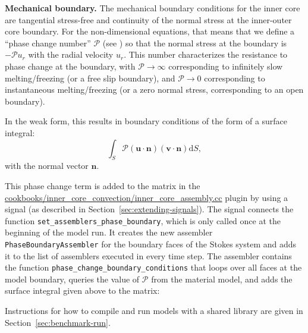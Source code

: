 \documentclass{article}
\begin{document}
\vspace{0.3cm}
\textbf{Mechanical boundary.}
The mechanical boundary conditions for the inner core are
tangential stress-free and continuity of the normal stress at the
inner-outer core boundary. For the non-dimensional equations, that
means that we define a ``phase change number'' $\mathcal{P}$ (see \cite{Deguen2013}) so that the
normal stress at the boundary is $-\mathcal{P} u_r$ with the radial velocity
$u_r$. This number characterizes the resistance to phase change at
the boundary, with $\mathcal{P}\rightarrow\infty$ corresponding to infinitely slow
melting/freezing (or a free slip boundary), and $\mathcal{P}\rightarrow0$ corresponding to
instantaneous melting/freezing (or a zero normal stress, corresponding to an open boundary).

In the weak form, this results in boundary conditions of the form
of a surface integral:
\begin{equation*}
\int_S \mathcal{P} (\mathbf u \cdot \mathbf n) (\mathbf v \cdot \mathbf n) \text{d}S,
\end{equation*}
with the normal vector $\mathbf n$.

This phase change term is added to the matrix in the
\url{cookbooks/inner_core_convection/inner_core_assembly.cc} plugin by using a signal
(as described in Section~\ref{sec:extending-signals}). The signal
connects the function \verb!set_assemblers_phase_boundary!, which is only called once at the beginning of
the model run. It creates the new assembler \texttt{PhaseBoundaryAssembler} for the boundary faces of the Stokes
system and adds it to the list of assemblers executed in every time step.
The assembler contains the function \verb!phase_change_boundary_conditions! that loops over all faces at the model
boundary, queries the value of $\mathcal{P}$ from the material model, and adds the surface integral given above
to the matrix:

Instructions for how to compile and run models with a shared library are given in Section~\ref{sec:benchmark-run}.
\end{document}
